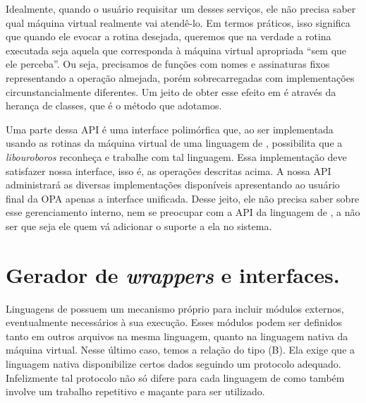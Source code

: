     Idealmente, quando o usuário requisitar um desses serviços, ele não precisa
    saber qual máquina virtual realmente vai atendê-lo. Em termos práticos, isso
    significa que quando ele evocar a rotina desejada, queremos que na verdade a
    rotina executada seja aquela que corresponda à máquina virtual apropriada
    ``sem que ele perceba''. Ou seja, precisamos de funções com nomes e
    assinaturas\footnotemark{} fixos representando a operação almejada, porém
    sobrecarregadas com implementações circunstancialmente diferentes. Um jeito
    de obter esse efeito em \CXX{} é através da herança de classes, que é o
    método que adotamos.



    Uma parte dessa API é uma interface polimórfica que, ao ser implementada usando
    as rotinas da máquina virtual de uma linguagem de \script{}, possibilita que
    a \emph{libouroboros} reconheça e trabalhe com tal linguagem. Essa
    implementação deve satisfazer nossa interface, isso é, as operações
    descritas acima. A nossa API administrará as diversas implementações
    disponíveis apresentando ao usuário final da OPA apenas a interface
    unificada. Desse jeito, ele não precisa saber sobre esse gerenciamento
    interno, nem se preocupar com a API da linguagem de \script{}, a não ser que
    seja ele quem vá adicionar o suporte a ela no sistema.
    
  
  
  \section{Gerador de \emph{wrappers} e interfaces.}
  \label{sec:estrutura:opwig}


    Linguagens de \script{} possuem um mecanismo próprio para incluir módulos
    externos, eventualmente necessários à sua execução. Esses módulos podem ser
    definidos tanto em outros arquivos na mesma linguagem, quanto na linguagem
    nativa da máquina virtual. Nesse último caso, temos a relação do tipo (B). Ela
    exige que a linguagem nativa disponibilize certos dados seguindo um protocolo
    adequado. Infelizmente tal protocolo não só difere para cada linguagem de
    \script{} como também involve um trabalho repetitivo e maçante para ser utilizado. 

